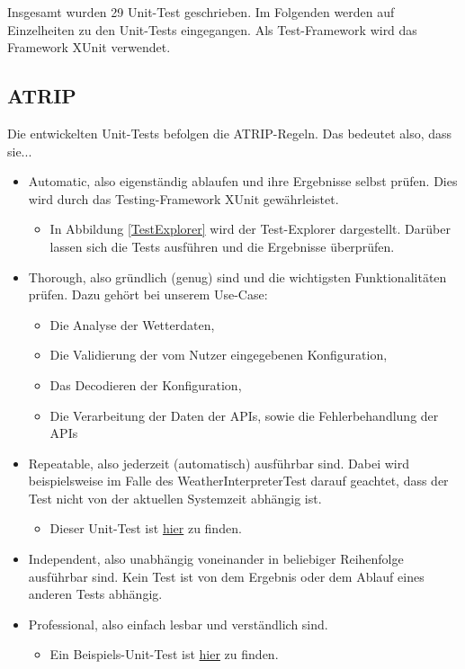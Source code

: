 Insgesamt wurden 29 Unit-Test geschrieben. Im Folgenden werden auf Einzelheiten zu den Unit-Tests eingegangen. Als Test-Framework wird das Framework XUnit verwendet.
\subsection{ATRIP}
Die entwickelten Unit-Tests befolgen die ATRIP-Regeln.
Das bedeutet also, dass sie...
\begin{itemize}
\item Automatic, also eigenständig ablaufen und ihre Ergebnisse selbst prüfen. Dies wird durch das Testing-Framework XUnit gewährleistet.
\begin{itemize}
\item In Abbildung \ref{TestExplorer} wird der Test-Explorer dargestellt. Darüber lassen sich die Tests ausführen und die Ergebnisse überprüfen.
\end{itemize}
\item Thorough, also gründlich (genug) sind und die wichtigsten Funktionalitäten prüfen. Dazu gehört bei unserem Use-Case:
\begin{itemize}
\item Die Analyse der Wetterdaten,
\item Die Validierung der vom Nutzer eingegebenen Konfiguration,
\item Das Decodieren der Konfiguration,
\item Die Verarbeitung der Daten der APIs, sowie die Fehlerbehandlung der APIs
\end{itemize}
\item Repeatable, also jederzeit (automatisch) ausführbar sind. Dabei wird beispielsweise im Falle des WeatherInterpreterTest darauf geachtet, dass der Test nicht von der aktuellen Systemzeit abhängig ist.
\begin{itemize}
\item Dieser Unit-Test ist \href{https://github.com/Bronzila/WeatherWallpaper/blob/master/WeatherWallpaperTest/WeatherInterpreterTest.cs}{\color{blue}hier} zu finden.
\end{itemize}
\item Independent, also unabhängig voneinander in beliebiger Reihenfolge ausführbar sind. Kein Test ist von dem Ergebnis oder dem Ablauf eines anderen Tests abhängig.
\item Professional, also einfach lesbar und verständlich sind.
\begin{itemize}
\item Ein Beispiels-Unit-Test ist \href{https://github.com/Bronzila/WeatherWallpaper/blob/master/WeatherWallpaperTest/ImageHandlerTest.cs}{\color{blue}hier} zu finden.
\end{itemize}
\end{itemize}
